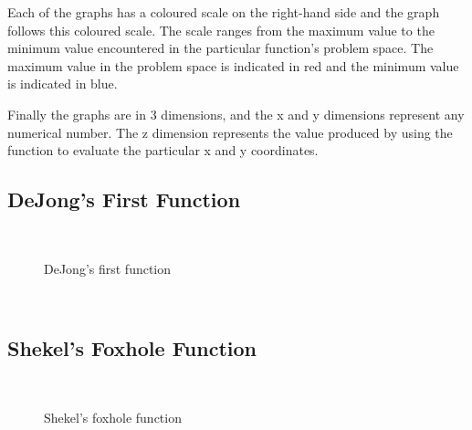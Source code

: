 Each of the graphs has a coloured scale on the right-hand side and the graph follows this coloured scale. The scale ranges from the maximum value to the minimum value encountered in the particular function's problem space. The maximum value in the problem space is indicated in red and the minimum value is indicated in blue.

Finally the graphs are in 3 dimensions, and the x and y dimensions represent any numerical number. The z dimension represents the value produced by using the function to evaluate the particular x and y coordinates.
\pagebreak
\subsection{DeJong's First Function}
~
\begin{figure}[hpt]
	\centering
	\setlength \fboxsep{0pt}
	\setlength \fboxrule{0.5pt}
	\caption{DeJong's first function}
	\label{fig:DeJongF1Graph}
\end{figure}
~
\subsection{Shekel's Foxhole Function}
~
\begin{figure}[hpt]
	\centering
	\setlength \fboxsep{0pt}
	\setlength \fboxrule{0.5pt}
	\caption{Shekel's foxhole function}
	\label{fig:ShekelGraph}
\end{figure}
~
